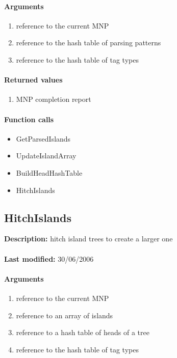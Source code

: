 \paragraph{Arguments}
\begin{enumerate}
\item reference to the current MNP
\item reference to the hash table of parsing patterns
\item reference to the hash table of tag types
\end{enumerate}

\paragraph{Returned values}
\begin{enumerate}
\item MNP completion report
\end{enumerate}

\paragraph{Function calls}
\begin{itemize}
\item GetParsedIslands
\item UpdateIslandArray
\item BuildHeadHashTable
\item HitchIslands
\end{itemize}

\subsection{HitchIslands}
\textbf{Description:} hitch island trees to create a larger one\\
\\\textbf{Last modified:} 30/06/2006

\paragraph{Arguments}
\begin{enumerate}
\item reference to the current MNP
\item reference to an array of islands
\item reference to a hash table of heads of a tree
\item reference to the hash table of tag types
\end{enumerate}

